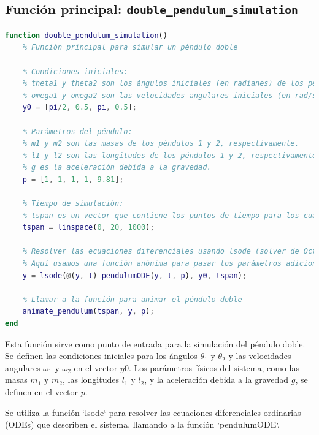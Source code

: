 \documentclass[12pt]{article}
\begin{document}
\subsection{Función principal: \texttt{double\_pendulum\_simulation}}
\begin{lstlisting}[language=Matlab]
function double_pendulum_simulation()
    % Función principal para simular un péndulo doble

    % Condiciones iniciales:
    % theta1 y theta2 son los ángulos iniciales (en radianes) de los péndulos 1 y 2, respectivamente.
    % omega1 y omega2 son las velocidades angulares iniciales (en rad/s) de los péndulos 1 y 2, respectivamente.
    y0 = [pi/2, 0.5, pi, 0.5];

    % Parámetros del péndulo:
    % m1 y m2 son las masas de los péndulos 1 y 2, respectivamente.
    % l1 y l2 son las longitudes de los péndulos 1 y 2, respectivamente.
    % g es la aceleración debida a la gravedad.
    p = [1, 1, 1, 1, 9.81];

    % Tiempo de simulación:
    % tspan es un vector que contiene los puntos de tiempo para los cuales se calcularán las soluciones.
    tspan = linspace(0, 20, 1000);

    % Resolver las ecuaciones diferenciales usando lsode (solver de Octave para ODEs)
    % Aquí usamos una función anónima para pasar los parámetros adicionales p a pendulumODE
    y = lsode(@(y, t) pendulumODE(y, t, p), y0, tspan);

    % Llamar a la función para animar el péndulo doble
    animate_pendulum(tspan, y, p);
end

\end{lstlisting}

Esta función sirve como punto de entrada para la simulación del péndulo doble. Se definen las condiciones iniciales para los ángulos \(\theta_1\) y \(\theta_2\) y las velocidades angulares \(\omega_1\) y \(\omega_2\) en el vector \(y0\). Los parámetros físicos del sistema, como las masas \(m_1\) y \(m_2\), las longitudes \(l_1\) y \(l_2\), y la aceleración debida a la gravedad \(g\), se definen en el vector \(p\).

Se utiliza la función `lsode` para resolver las ecuaciones diferenciales ordinarias (ODEs) que describen el sistema, llamando a la función `pendulumODE`.
\end{document}

